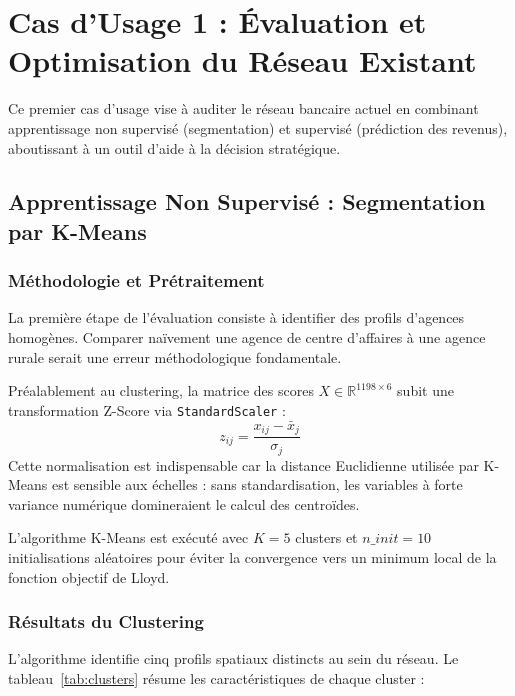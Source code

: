 \section{Cas d'Usage 1 : Évaluation et Optimisation du Réseau Existant}

Ce premier cas d'usage vise à auditer le réseau bancaire actuel en combinant apprentissage non supervisé (segmentation) et supervisé (prédiction des revenus), aboutissant à un outil d'aide à la décision stratégique.

\subsection{Apprentissage Non Supervisé : Segmentation par K-Means}

\subsubsection{Méthodologie et Prétraitement}

La première étape de l'évaluation consiste à identifier des profils d'agences homogènes. Comparer naïvement une agence de centre d'affaires à une agence rurale serait une erreur méthodologique fondamentale.

Préalablement au clustering, la matrice des scores $X \in \mathbb{R}^{1198 \times 6}$ subit une transformation Z-Score via \texttt{StandardScaler} :
\begin{equation}
z_{ij} = \frac{x_{ij} - \bar{x}_j}{\sigma_j}
\end{equation}
Cette normalisation est indispensable car la distance Euclidienne utilisée par K-Means est sensible aux échelles : sans standardisation, les variables à forte variance numérique domineraient le calcul des centroïdes.

L'algorithme K-Means est exécuté avec $K=5$ clusters et $n\_init=10$ initialisations aléatoires pour éviter la convergence vers un minimum local de la fonction objectif de Lloyd.

\subsubsection{Résultats du Clustering}

L'algorithme identifie cinq profils spatiaux distincts au sein du réseau. Le tableau~\ref{tab:clusters} résume les caractéristiques de chaque cluster :

